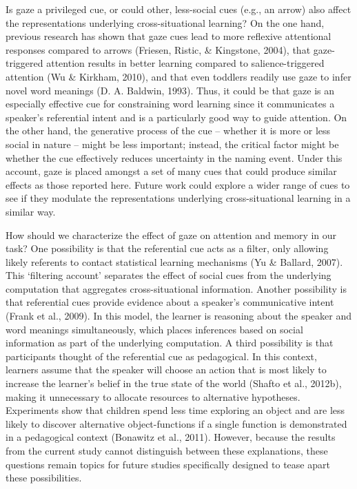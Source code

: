 \documentclass[oneside]{report}
\begin{document}
Is gaze a privileged cue, or could other, less-social cues (e.g., an
arrow) also affect the representations underlying cross-situational
learning? On the one hand, previous research has shown that gaze cues
lead to more reflexive attentional responses compared to arrows
(Friesen, Ristic, \& Kingstone, 2004), that gaze-triggered attention
results in better learning compared to salience-triggered attention (Wu
\& Kirkham, 2010), and that even toddlers readily use gaze to infer
novel word meanings (D. A. Baldwin, 1993). Thus, it could be that gaze
is an especially effective cue for constraining word learning since it
communicates a speaker's referential intent and is a particularly good
way to guide attention. On the other hand, the generative process of the
cue -- whether it is more or less social in nature -- might be less
important; instead, the critical factor might be whether the cue
effectively reduces uncertainty in the naming event. Under this account,
gaze is placed amongst a set of many cues that could produce similar
effects as those reported here. Future work could explore a wider range
of cues to see if they modulate the representations underlying
cross-situational learning in a similar way.

How should we characterize the effect of gaze on attention and memory in
our task? One possibility is that the referential cue acts as a filter,
only allowing likely referents to contact statistical learning
mechanisms (Yu \& Ballard, 2007). This `filtering account' separates the
effect of social cues from the underlying computation that aggregates
cross-situational information. Another possibility is that referential
cues provide evidence about a speaker's communicative intent (Frank et
al., 2009). In this model, the learner is reasoning about the speaker
and word meanings simultaneously, which places inferences based on
social information as part of the underlying computation. A third
possibility is that participants thought of the referential cue as
pedagogical. In this context, learners assume that the speaker will
choose an action that is most likely to increase the learner's belief in
the true state of the world (Shafto et al., 2012b), making it
unnecessary to allocate resources to alternative hypotheses. Experiments
show that children spend less time exploring an object and are less
likely to discover alternative object-functions if a single function is
demonstrated in a pedagogical context (Bonawitz et al., 2011). However,
because the results from the current study cannot distinguish between
these explanations, these questions remain topics for future studies
specifically designed to tease apart these possibilities.
\end{document}
